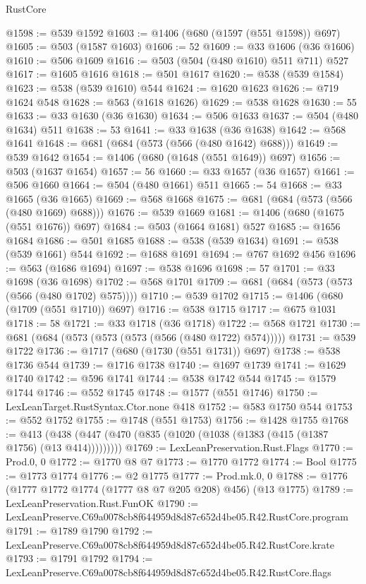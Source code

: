 \begin{lexlean}{RustCore}
\begin{coremodule}
@1598 := @539 @1592
@1603 := @1406 (@680 (@1597 (@551 @1598)) @697)
@1605 := @503 (@1587 @1603)
@1606 := 52
@1609 := @33 @1606 (@36 @1606)
@1610 := @506 @1609
@1616 := @503 (@504 (@480 @1610) @511 @711) @527
@1617 := @1605 @1616
@1618 := @501 @1617
@1620 := @538 (@539 @1584)
@1623 := @538 (@539 @1610) @544
@1624 := @1620 @1623
@1626 := @719 @1624 @548
@1628 := @563 (@1618 @1626)
@1629 := @538 @1628
@1630 := 55
@1633 := @33 @1630 (@36 @1630)
@1634 := @506 @1633
@1637 := @504 (@480 @1634) @511
@1638 := 53
@1641 := @33 @1638 (@36 @1638)
@1642 := @568 @1641
@1648 := @681 (@684 (@573 (@566 (@480 @1642) @688)))
@1649 := @539 @1642
@1654 := @1406 (@680 (@1648 (@551 @1649)) @697)
@1656 := @503 (@1637 @1654)
@1657 := 56
@1660 := @33 @1657 (@36 @1657)
@1661 := @506 @1660
@1664 := @504 (@480 @1661) @511
@1665 := 54
@1668 := @33 @1665 (@36 @1665)
@1669 := @568 @1668
@1675 := @681 (@684 (@573 (@566 (@480 @1669) @688)))
@1676 := @539 @1669
@1681 := @1406 (@680 (@1675 (@551 @1676)) @697)
@1684 := @503 (@1664 @1681) @527
@1685 := @1656 @1684
@1686 := @501 @1685
@1688 := @538 (@539 @1634)
@1691 := @538 (@539 @1661) @544
@1692 := @1688 @1691
@1694 := @767 @1692 @456
@1696 := @563 (@1686 @1694)
@1697 := @538 @1696
@1698 := 57
@1701 := @33 @1698 (@36 @1698)
@1702 := @568 @1701
@1709 := @681 (@684 (@573 (@573 (@566 (@480 @1702) @575))))
@1710 := @539 @1702
@1715 := @1406 (@680 (@1709 (@551 @1710)) @697)
@1716 := @538 @1715
@1717 := @675 @1031
@1718 := 58
@1721 := @33 @1718 (@36 @1718)
@1722 := @568 @1721
@1730 := @681 (@684 (@573 (@573 (@573 (@566 (@480 @1722) @574)))))
@1731 := @539 @1722
@1736 := @1717 (@680 (@1730 (@551 @1731)) @697)
@1738 := @538 @1736 @544
@1739 := @1716 @1738
@1740 := @1697 @1739
@1741 := @1629 @1740
@1742 := @596 @1741
@1744 := @538 @1742 @544
@1745 := @1579 @1744
@1746 := @552 @1745
@1748 := @1577 (@551 @1746)
@1750 := LexLeanTarget.RustSyntax.Ctor.none @418
@1752 := @583 @1750 @544
@1753 := @552 @1752
@1755 := @1748 (@551 @1753)
@1756 := @1428 @1755
@1768 := @413 (@438 (@447 (@470 (@835 (@1020 (@1038 (@1383 (@415 (@1387 @1756) (@13 @414)))))))))
@1769 := LexLeanPreservation.Rust.Flags
@1770 := Prod.{0, 0}
@1772 := @1770 @8 @7
@1773 := @1770 @1772
@1774 := Bool
@1775 := @1773 @1774
@1776 := @2 @1775
@1777 := Prod.mk.{0, 0}
@1788 := @1776 (@1777 @1772 @1774 (@1777 @8 @7 @205 @208) @456) (@13 @1775)
@1789 := LexLeanPreservation.Rust.FunOK
@1790 := LexLeanPreserve.C69a0078cb8f644959d8d87c652d4be05.R42.RustCore.program
@1791 := @1789 @1790
@1792 := LexLeanPreserve.C69a0078cb8f644959d8d87c652d4be05.R42.RustCore.krate
@1793 := @1791 @1792
@1794 := LexLeanPreserve.C69a0078cb8f644959d8d87c652d4be05.R42.RustCore.flags

\end{coremodule}
\end{lexlean}
